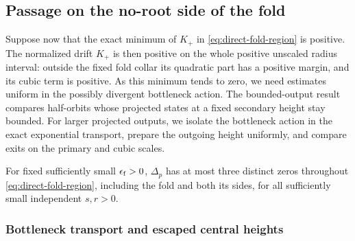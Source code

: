 \subsection{Passage on the no-root side of the fold}
\label{sec:direct-no-root-fold}

Suppose now that the exact minimum of \(K_+\) in
\eqref{eq:direct-fold-region} is positive. The normalized drift
\(K_+\) is then positive on the whole positive unscaled radius
interval: outside the fixed fold collar its quadratic
part has a positive margin, and its cubic term is positive.
As this minimum tends to zero, we need estimates uniform in the
possibly divergent bottleneck action. The bounded-output result
compares half-orbits whose projected states at a fixed secondary
height stay bounded. For larger projected outputs, we isolate the
bottleneck action in the exact exponential transport, prepare the
outgoing height uniformly, and compare exits on the primary and
cubic scales.

\begin{proposition}
\label{prop:direct-negative-fold}
For fixed sufficiently small \(\epsilon_{\rm f}>0\), \(\Delta_p\) has at most
three distinct zeros throughout \eqref{eq:direct-fold-region}, including
the fold and both its sides, for all sufficiently small independent
\(s,r>0\).
\end{proposition}

\subsubsection{Bottleneck transport and escaped central heights}

